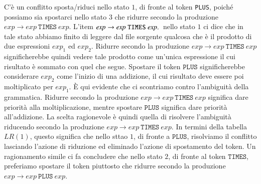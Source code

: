 C'\`e un conflitto sposta/riduci
nello stato $1$, di fronte al token \texttt{PLUS}, poich\'e
possiamo sia spostarci nello stato $3$ che ridurre secondo la produzione
$\mathit{exp}\to\mathit{exp}\ \mathtt{TIMES}\ \mathit{exp}$. L'item
$\mathit{exp}\to\mathit{exp}\ \mathtt{TIMES}\ \mathit{exp}\idot$ nello
stato $1$ ci dice che in tale stato abbiamo finito di leggere dal file
sorgente qualcosa che \`e il prodotto di due espressioni $\mathit{exp}_1$
ed $\mathit{exp}_2$. Ridurre secondo
la produzione $\mathit{exp}\to\mathit{exp}\ \mathtt{TIMES}\ \mathit{exp}$
significherebbe quindi vedere tale prodotto come un'unica espressione il cui
risultato \`e sommato con quel che segue.
Spostare il token $\mathtt{PLUS}$ significherebbe considerare
$\mathit{exp}_2$ come l'inizio di una addizione, il cui risultato deve
essere poi moltiplicato per $\mathit{exp}_1$. \`E qui evidente che
ci scontriamo contro l'ambiguit\`a della grammatica. Ridurre secondo la
produzione $\mathit{exp}\to\mathit{exp}\ \mathtt{TIMES}\ \mathit{exp}$
significa dare priorit\`a alla moltiplicazione, mentre spostare
$\mathtt{PLUS}$ significa dare priorit\`a all'addizione. La scelta ragionevole
\`e quindi quella di risolvere l'ambiguit\`a riducendo secondo la produzione
$\mathit{exp}\to\mathit{exp}\ \mathtt{TIMES}\ \mathit{exp}$. In termini della
tabella $\mathit{LR}(1)$, questo significa che nello sttao $1$, di fronte
a $\mathtt{PLUS}$, risolviamo il conflitto
lasciando l'azione di riduzione ed eliminado l'azione di spostamento del token.
Un ragionamento simile ci fa concludere che nello stato $2$,
di fronte al token $\mathtt{TIMES}$, preferiamo spostare il token
piuttosto che ridurre secondo la produzione
$\mathit{exp}\to\mathit{exp}\ \mathtt{PLUS}\ \mathit{exp}$.


